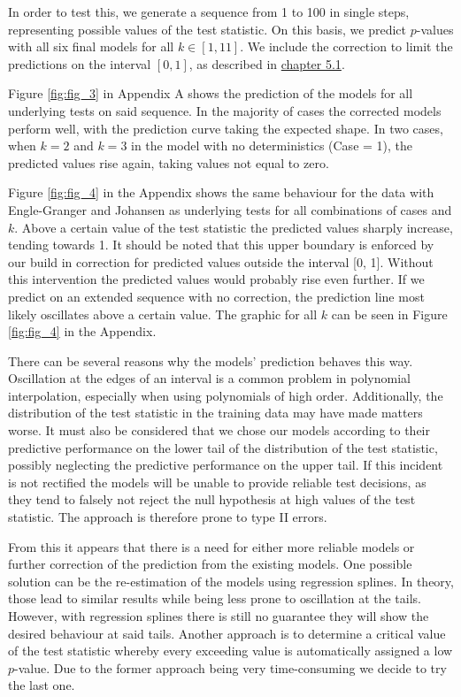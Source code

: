 \documentclass[12pt,a4paper]{article}
\begin{document}
In order to test this, we generate a sequence from 1 to 100 in single
steps, representing possible values of the test statistic. On this
basis, we predict \(p\)-values with all six final models for all
\(k \in [1, 11]\). We include the correction to limit the predictions on
the interval \([0, 1]\), as described in
\protect\hyperlink{rmse-comparison}{chapter 5.1}.

Figure \ref{fig:fig_3} in Appendix A shows the prediction of the models
for all underlying tests on said sequence. In the majority of cases the
corrected models perform well, with the prediction curve taking the
expected shape. In two cases, when \(k = 2\) and \(k = 3\) in the model
with no deterministics (Case = 1), the predicted values rise again,
taking values not equal to zero.

Figure \ref{fig:fig_4} in the Appendix shows the same behaviour for the
data with Engle-Granger and Johansen as underlying tests for all
combinations of cases and \(k\). Above a certain value of the test
statistic the predicted values sharply increase, tending towards 1. It
should be noted that this upper boundary is enforced by our build in
correction for predicted values outside the interval {[}0, 1{]}. Without
this intervention the predicted values would probably rise even further.
If we predict on an extended sequence with no correction, the prediction
line most likely oscillates above a certain value. The graphic for all
\(k\) can be seen in Figure \ref{fig:fig_4} in the Appendix.

There can be several reasons why the models' prediction behaves this
way. Oscillation at the edges of an interval is a common problem in
polynomial interpolation, especially when using polynomials of high
order. Additionally, the distribution of the test statistic in the
training data may have made matters worse. It must also be considered
that we chose our models according to their predictive performance on
the lower tail of the distribution of the test statistic, possibly
neglecting the predictive performance on the upper tail. If this
incident is not rectified the models will be unable to provide reliable
test decisions, as they tend to falsely not reject the null hypothesis
at high values of the test statistic. The approach is therefore prone to
type II errors.

From this it appears that there is a need for either more reliable
models or further correction of the prediction from the existing models.
One possible solution can be the re-estimation of the models using
regression splines. In theory, those lead to similar results while being
less prone to oscillation at the tails. However, with regression splines
there is still no guarantee they will show the desired behaviour at said
tails. Another approach is to determine a critical value of the test
statistic whereby every exceeding value is automatically assigned a low
\(p\)-value. Due to the former approach being very time-consuming we
decide to try the last one.
\end{document}
